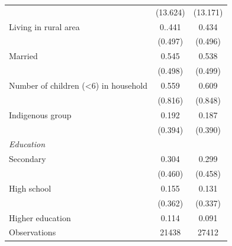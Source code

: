 \documentclass[12pt,english,british]{article}
\begin{document}
\begin{table}[h]
\begin{center}
\begin{adjustbox}{max width=\textwidth}
{\begin{tabular}{l*{2}{c}}
                    &    (13.624)&    (13.171)\\
Living in rural area&       0..441&       0.434\\
                    &     (0.497)&     (0.496)\\
Married             &       0.545&       0.538\\
                    &     (0.498)&     (0.499)\\
Number of children (<6) in household&       0.559&       0.609\\
                    &     (0.816)&     (0.848)\\
Indigenous group    &      0.192&       0.187\\
                    &     (0.394)&     (0.390)\\
\hspace*{10mm}\emph{Education}&& \\
Secondary          &       0.304&       0.299\\
                    &     (0.460)&     (0.458)\\
High school         &       0.155&       0.131\\
                    &     (0.362)&     (0.337)\\
Higher education    &       0.114&       0.091\\
\midrule
Observations        &       21438&    27412\\
\bottomrule
\end{tabular}%
}
\end{adjustbox}
\end{center}
\end{table}
\end{document}
